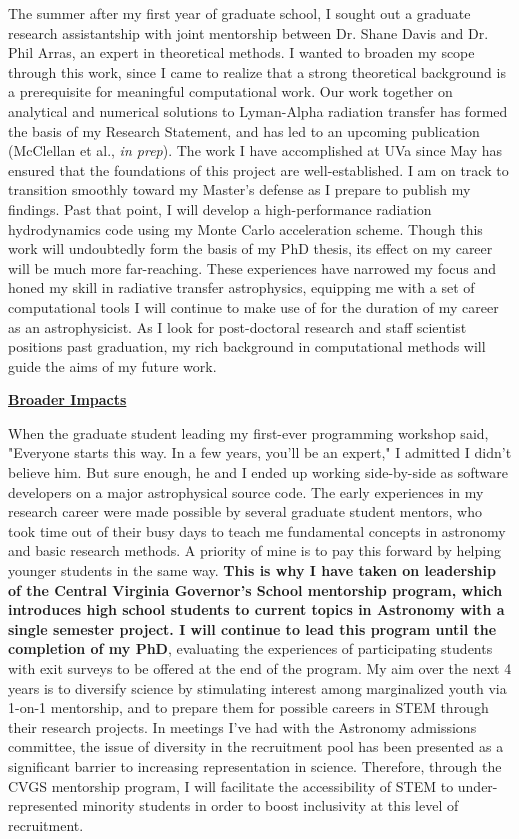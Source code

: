 \documentclass[11pt]{article}
\begin{document}
The summer after my first year of graduate school, I sought out a graduate research assistantship with joint mentorship between Dr. Shane Davis and Dr. Phil Arras, an expert in theoretical methods. I wanted to broaden my scope through this work, since I came to realize that a strong theoretical background is a prerequisite for meaningful computational work. Our work together on analytical and numerical solutions to Lyman-Alpha radiation transfer has formed the basis of my Research Statement, and has led to an upcoming publication (McClellan et al., \textit{in prep}). The work I have accomplished at UVa since May has ensured that the foundations of this project are well-established. I am on track to transition smoothly toward my Master's defense as I prepare to publish my findings. Past that point, I will develop a high-performance radiation hydrodynamics code using my Monte Carlo acceleration scheme. Though this work will undoubtedly form the basis of my PhD thesis, its effect on my career will be much more far-reaching. These experiences have narrowed my focus and honed my skill in radiative transfer astrophysics, equipping me with a set of computational tools I will continue to make use of for the duration of my career as an astrophysicist. As I look for post-doctoral research and staff scientist positions past graduation, my rich background in computational methods will guide the aims of my future work.

\thispagestyle{empty}
\noindent \textbf{\underline{Broader Impacts}} 


When the graduate student leading my first-ever programming workshop said, "Everyone starts this way. In a few years, you'll be an expert," I admitted I didn't believe him. But sure enough, he and I ended up working side-by-side as software developers on a major astrophysical source code. The early experiences in my research career were made possible by several graduate student mentors, who took time out of their busy days to teach me fundamental concepts in astronomy and basic research methods. A priority of mine is to pay this forward by helping younger students in the same way. \textbf{This is why I have taken on leadership of the Central Virginia Governor's School mentorship program, which introduces high school students to current topics in Astronomy with a single semester project. I will continue to lead this program until the completion of my PhD}, evaluating the experiences of participating students with exit surveys to be offered at the end of the program. My aim over the next 4 years is to diversify science by stimulating interest among marginalized youth via 1-on-1 mentorship, and to prepare them for possible careers in STEM through their research projects. In meetings I've had with the Astronomy admissions committee, the issue of diversity in the recruitment pool has been presented as a significant barrier to increasing representation in science. Therefore, through the CVGS mentorship program, I will facilitate the accessibility of STEM to under-represented minority students in order to boost inclusivity at this level of recruitment.
\end{document}
